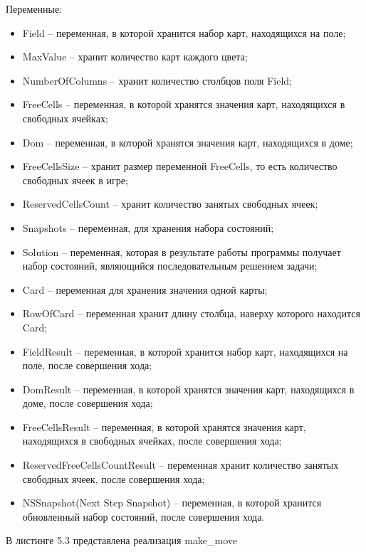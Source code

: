 \documentclass[12pt]{report}
\begin{document}
Переменные:
\begin{itemize}
\item Field – переменная, в которой хранится набор карт, находящихся на поле;
\item MaxValue – хранит количество карт каждого цвета;
\item NumberOfColumns – хранит количество столбцов поля Field;
\item FreeCells – переменная, в которой хранятся значения карт, находящихся в свободных ячейках;
\item Dom – переменная, в которой хранятся значения карт, находящихся в доме;
\item FreeCellsSize – хранит размер переменной FreeCells, то есть количество свободных ячеек в игре;
\item ReservedCellsCount – хранит количество занятых свободных ячеек;
\item Snapshots – переменная, для хранения набора состояний;
\item Solution – переменная, которая в результате работы программы получает набор состояний, являющийся последовательным решением задачи;
\item Card – переменная для хранения значения одной карты;
\item RowOfCard – переменная хранит длину столбца, наверху которого находится Card;
\item FieldResult – переменная, в которой хранится набор карт, находящихся на поле, после совершения хода;
\item DomResult – переменная, в которой хранятся значения карт, находящихся в доме, после совершения хода;
\item FreeCellsResult – переменная, в которой хранятся значения карт, находящихся в свободных ячейках, после совершения хода;
\item ReservedFreeCellsCountResult – переменная хранит количество занятых свободных ячеек, после совершения хода;
\item NSSnapshot(Next Step Snapshot) – переменная, в которой хранится обновленный набор состояний, после совершения хода.
\end{itemize}

В листинге 5.3 представлена реализация make\_move
\end{document}
